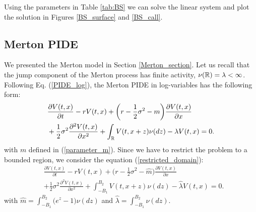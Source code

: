 Using the parameters in Table \ref{tab:BS} we can solve the linear system and plot the solution in Figures \ref{BS_surface} and \ref{BS_call}.



\subsection{Merton PIDE}


We presented the Merton model in Section \ref{Merton_section}. 
Let us recall that the jump component of the Merton process has finite activity, $\nu(\mathbb{R}) = \lambda < \infty$.
Following Eq. (\ref{PIDE_log}), the Merton PIDE in log-variables has the following form: 
\begin{align}\label{Merton_PIDE}
&  \frac{\partial V(t,x)}{\partial t} - r V(t,x) 
          + \biggl( r -\frac{1}{2}\sigma^2 -m \biggr) \frac{\partial V(t,x)}{\partial x} \\ \nonumber
          &+ \frac{1}{2} \sigma^2 \frac{\partial^2 V(t,x)}{\partial x^2} 
          + \int_{\mathbb{R}} V(t,x+z) \nu(dz) - \lambda V(t,x)  = 0.
\end{align}
with $m$ defined in (\ref{parameter_m}).
Since we have to restrict the problem to a bounded region, we consider the equation (\ref{restricted_domain}):
\begin{align*}
&  \frac{\partial V(t,x)}{\partial t} - r V(t,x) 
          + \biggl( r -\frac{1}{2}\sigma^2 - \hat m \biggr) \frac{\partial V(t,x)}{\partial x} \\
          &+ \frac{1}{2} \sigma^2 \frac{\partial^2 V(t,x)}{\partial x^2} 
          + \int_{-B_1}^{B_2} V(t,x+z) \nu(dz) - \hat \lambda V(t,x)  = 0.
\end{align*}
with $\hat m = \int_{-B_1}^{B_2} \bigl( e^z-1 \bigr) \nu(dz)$ and $\hat \lambda = \int_{-B_1}^{B_2} \nu(dz)$.

